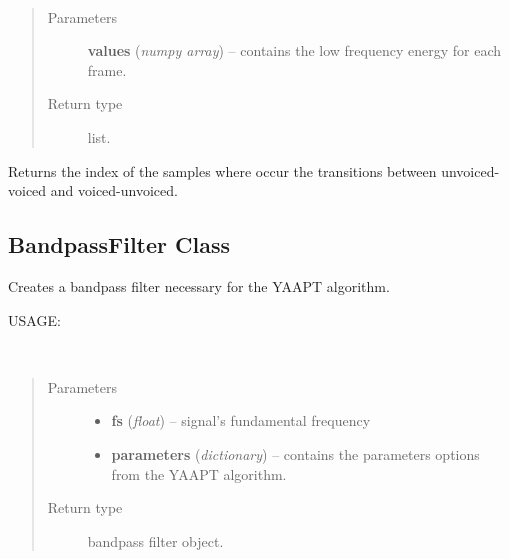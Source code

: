 \documentclass[letterpaper,10pt,english]{sphinxmanual}
\begin{document}
\begin{fulllineitems}
\label{pYAAPT:PitchObj.edges_finder}~\begin{quote}\begin{description}
\item[{Parameters}] \leavevmode
\textbf{values} (\emph{numpy array}) -- contains the low frequency energy for each frame.

\item[{Return type}] \leavevmode
list.

\end{description}\end{quote}

Returns the index of the samples where occur the transitions between unvoiced-voiced and voiced-unvoiced.

\end{fulllineitems}



\subsection{BandpassFilter Class}
\label{pYAAPT:bandpassfilter-class}
Creates a bandpass filter necessary for the YAAPT algorithm.

USAGE:

\begin{fulllineitems}
\label{pYAAPT:amfm_decompy.pYAAPT.BandpassFilter}~\begin{quote}\begin{description}
\item[{Parameters}] \leavevmode\begin{itemize}
\item {} 
\textbf{fs} (\emph{float}) -- signal's fundamental frequency

\item {} 
\textbf{parameters} (\emph{dictionary}) -- contains the parameters options from the YAAPT algorithm.

\end{itemize}

\item[{Return type}] \leavevmode
bandpass filter object.

\end{description}\end{quote}

\end{fulllineitems}
\end{document}
